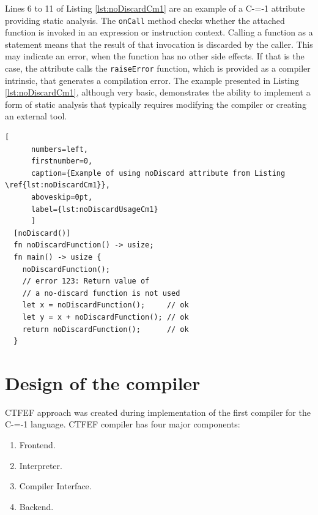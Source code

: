 Lines 6 to 11 of Listing \ref{lst:noDiscardCm1} are an example of a C-=-1 attribute providing static analysis.
The \lstinline{onCall} method checks whether the attached function is invoked in an expression or instruction context.
Calling a function as a statement means that the result of that invocation is discarded by the caller.
This may indicate an error, when the function has no other side effects.
If that is the case, the attribute calls the \lstinline{raiseError} function, which is provided as a compiler intrinsic, that generates a compilation error.
The example presented in Listing \ref{lst:noDiscardCm1}, although very basic, demonstrates the ability to implement a form of static analysis that typically requires modifying the compiler or creating an external tool.

\begin{minipage}{\linewidth}

	\begin{lstlisting}[
	  numbers=left,
	  firstnumber=0,
	  caption={Example of using noDiscard attribute from Listing \ref{lst:noDiscardCm1}},
	  aboveskip=0pt,
	  label={lst:noDiscardUsageCm1}
	  ]
  [noDiscard()]
  fn noDiscardFunction() -> usize;
  fn main() -> usize {
	noDiscardFunction();
	// error 123: Return value of
	// a no-discard function is not used
	let x = noDiscardFunction();     // ok
	let y = x + noDiscardFunction(); // ok
	return noDiscardFunction();      // ok
  }
  \end{lstlisting}
\end{minipage}

\section{Design of the compiler}
\label{compiler-design}

CTFEF approach was created during implementation of the first compiler for the C-=-1 language\cite{grabski2022compilation}.
CTFEF compiler has four major components:
\begin{enumerate}
	\item Frontend.
	\item Interpreter.
	\item Compiler Interface.
	\item Backend.
\end{enumerate}

